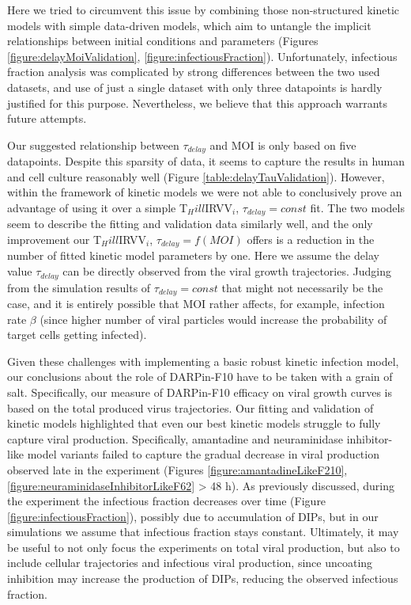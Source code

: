 Here we tried to circumvent this issue by combining those non-structured kinetic models with simple data-driven models, which aim to untangle the implicit relationships between initial conditions and parameters (Figures \ref{figure:delayMoiValidation}, \ref{figure:infectiousFraction}). Unfortunately, infectious fraction analysis was complicated by strong differences between the two used datasets, and use of just a single dataset with only three datapoints is hardly justified for this purpose. Nevertheless, we believe that this approach warrants future attempts.

Our suggested relationship between $\tau_{delay}$ and MOI is only based on five datapoints. Despite this sparsity of data, it seems to capture the results in human and cell culture reasonably well (Figure \ref{table:delayTauValidation}). However, within the framework of kinetic models we were not able to conclusively prove an advantage of using it over a simple T$_Hill$IRVV$_i$, $\tau_{delay} = const$ fit. The two models seem to describe the fitting and validation data similarly well, and the only improvement our T$_Hill$IRVV$_i$, $\tau_{delay} = f(MOI)$ offers is a reduction in the number of fitted kinetic model parameters by one. Here we assume the delay value $\tau_{delay}$ can be directly observed from the viral growth trajectories. Judging from the simulation results of $\tau_{delay} = const$ that might not necessarily be the case, and it is entirely possible that MOI rather affects, for example, infection rate $\beta$ (since higher number of viral particles would increase the probability of target cells getting infected). 

Given these challenges with implementing a basic robust kinetic infection model, our conclusions about the role of DARPin-F10 have to be taken with a grain of salt. Specifically, our measure of DARPin-F10 efficacy on viral growth curves is based on the total produced virus trajectories. Our fitting and validation of kinetic models highlighted that even our best kinetic models struggle to fully capture viral production. Specifically, amantadine and neuraminidase inhibitor-like model variants failed to capture the gradual decrease in viral production observed late in the experiment (Figures \ref{figure:amantadineLikeF210}, \ref{figure:neuraminidaseInhibitorLikeF62} > 48 h). As previously discussed, during the experiment the infectious fraction decreases over time (Figure \ref{figure:infectiousFraction}), possibly due to accumulation of DIPs, but in our simulations we assume that infectious fraction stays constant. Ultimately, it may be useful to not only focus the experiments on total viral production, but also to include cellular trajectories and infectious viral production, since uncoating inhibition may increase the production of DIPs, reducing the observed infectious fraction.

